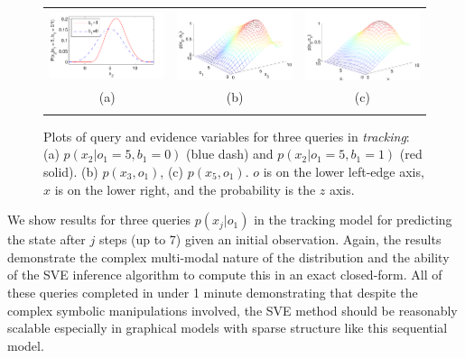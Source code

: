 \documentclass[letterpaper]{article}
\begin{document}
{%
\begin{figure}[t!]
\vspace{-5mm}
\begin{center}
\begin{tabular}{ccc}
\hspace{-3mm} \includegraphics[width=120pt]{radar_x_2_fix.pdf} & \hspace{-5mm} \includegraphics[width=120pt]{tracker_3d_x3o1_aistat.pdf} & \hspace{-4mm} \includegraphics[width=120pt]{tracker_3d_x5o1_aistat.pdf}\\ %
(a) & (b) & (c) \\
\multicolumn{3}{c}{}
\end{tabular}
\end{center}
\vspace{-6mm}
\caption{\footnotesize Plots of query and evidence variables for three
queries in \emph{tracking}: (a)  $p(x_2|o_1=5,b_1=0)$ (blue dash)
and $p(x_2|o_1=5,b_1=1)$ (red solid).
(b) $p(x_3,o_1)$, (c) $p(x_5,o_1)$.  $o$ is on the lower left-edge
axis, $x$ is on the lower right, and the probability is the $z$ axis.}
\label{fig:track}
\vspace{-4mm}
\end{figure}

We show results for three queries $p(x_j|o_1)$ in the {tracking}
model for predicting the state after $j$ steps (up to 7) given an
initial observation.  Again, the results demonstrate the complex
multi-modal nature of the distribution and the ability of the SVE
inference algorithm to compute this in an exact closed-form.  All of
these queries completed in under 1 minute demonstrating that despite
the complex symbolic manipulations involved, the SVE method should be
reasonably scalable especially in graphical models with sparse
structure like this sequential model.

}
\end{document}
